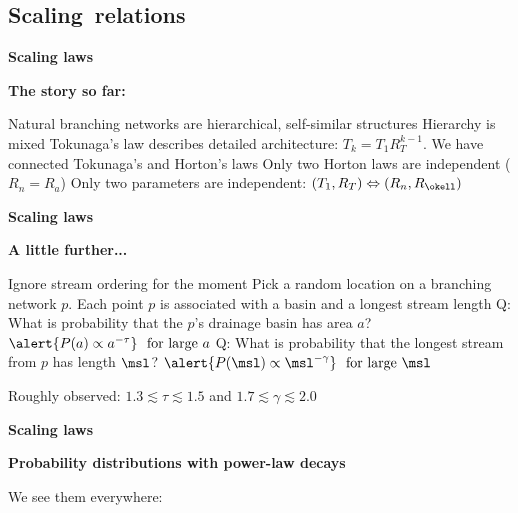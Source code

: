 \begin{frame}[label=]
\begin{frame}[label=]
\begin{frame}[label=]
\begin{frame}[label=]
\begin{frame}[label=]
\begin{frame}[label=]
\begin{frame}[label=]
\begin{frame}[label=]
\begin{frame}[label=]
\begin{frame}[label=]
\begin{frame}[label=]
\begin{frame}[label=]
\begin{frame}[label=]
\begin{frame}[label=]
\begin{frame}[label=]
\begin{frame}[label=]
\begin{frame}[label=]
\begin{frame}[label=]
\begin{frame}[label=]
\begin{frame}[label=]


\section{Scaling\ relations}

\begin{frame}[label=]
  \textbf{Scaling laws}

  \textbf{The story so far:}
    
     Natural branching networks are \alert{hierarchical},
      \alert{self-similar} structures
     Hierarchy is \alert{mixed}
     Tokunaga's law describes detailed architecture: $T_k = T_1R_T^{k-1}$.
     We have connected Tokunaga's and Horton's laws
     Only two Horton laws are independent ($R_n = R_a$)
     Only \alert{two} parameters are \alert{independent}: $(T_1,R_T) \Leftrightarrow (R_n,R_\okell)$
    
  
  

\begin{frame}[label=]
  \textbf{Scaling laws}

  \textbf{A little further...}
    
     Ignore stream ordering for the moment
     Pick a random location on a branching network $p$.
     Each point $p$ is associated with a basin and a longest stream length
     \alert{Q:} What is probability that the $p$'s drainage basin
      has area $a$?
      {
        $ \alert{P(a) \propto a^{-\tau}} \mbox{\ \ for large $a$}$
      }
     \alert{Q:} What is probability that the longest stream from
      $p$ has length $\msl$?
      {
        $ \alert{P(\msl) \propto \msl^{-\gamma}} \mbox{\ \ for large $\msl$}$
      }
    
      Roughly observed: $1.3 \lesssim \tau \lesssim 1.5$
      and  $1.7 \lesssim \gamma \lesssim 2.0$
    
  
  

\begin{frame}[label=]
  \textbf{Scaling laws}

  \textbf{Probability distributions with power-law decays}
    
     We see them everywhere:
      

\end{frame}
\end{frame}
\end{frame}
\end{frame}
\end{frame}
\end{frame}
\end{frame}
\end{frame}
\end{frame}
\end{frame}
\end{frame}
\end{frame}
\end{frame}
\end{frame}
\end{frame}
\end{frame}
\end{frame}
\end{frame}
\end{frame}
\end{frame}
\end{frame}
\end{frame}
\end{frame}

